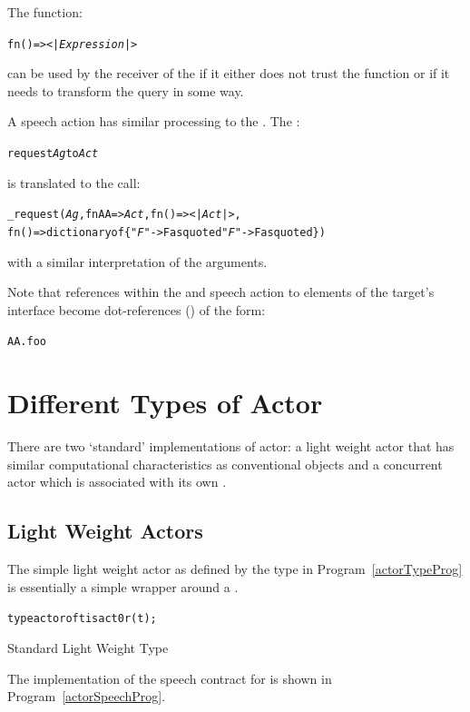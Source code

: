 The function:
\begin{alltt}
fn ()=><|\emph{Expression}|>
\end{alltt}
can be used by the receiver of the  if it either does not trust the function or if it needs to transform the query in some way. 

A  speech action has similar processing to the . The :

\begin{alltt}
request \emph{Ag} to \emph{Act}
\end{alltt}
is translated to the call:
\begin{alltt}
_request(\emph{Ag},fn AA=>\emph{Act},fn ()=><|\emph{Act}|>,
      fn ()=>dictionary of \{"\emph{F}"->F as quoted\sequence{;}"\emph{F\subn}"->F\subn as quoted\})
\end{alltt}
with a similar interpretation of the arguments.

Note that references within the  and  speech action to elements of the target's interface become dot-references () of the form:
\begin{alltt}
AA.foo
\end{alltt}

\section{Different Types of Actor}
\label{actorTypes}
There are two `standard' implementations of actor: a light weight actor that has similar computational characteristics as conventional objects and a concurrent actor which is associated with its own .

\subsection{Light Weight Actors}
\label{liteActor}

The simple light weight actor as defined by the  type in Program~\vref{actorTypeProg} is essentially a simple wrapper around a . 

\begin{program}
\begin{alltt}
type actor of t is act0r(t);
\end{alltt}
\caption{Standard Light Weight  Type}
\label{actorTypeProg}
\end{program}

The implementation of the speech contract for  is shown in Program~\vref{actorSpeechProg}.

